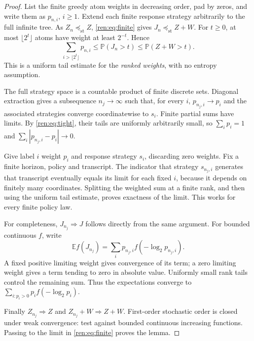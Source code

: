 \documentclass[11pt,a4paper]{article}
\theoremstyle{definition}\newtheorem{definition}[theorem]{Definition}
\theoremstyle{remark}\newtheorem{remark}[theorem]{Remark}
\newcommand{\E}{\mathbb E}
\newcommand{\Pp}{\mathbb P}
\newcommand{\st}{\preceq_{\mathrm{st}}}
\numberwithin{equation}{section}
\begin{document}
\begin{proof}
List the finite greedy atom weights in decreasing order, pad by zeros, and
write them as $p_{n,i}$, $i\ge1$. Extend each finite response strategy
arbitrarily to the full infinite tree. As $Z_n\st Z$, \eqref{ren:eq:finite} gives
$J_n\st Z+W$. For $t\ge0$, at most $\lfloor2^t\rfloor$ atoms have weight
at least $2^{-t}$. Hence
\begin{equation}\label{ren:eq:tight}
 \sum_{i>\lfloor2^t\rfloor}p_{n,i}
 \le \Pp(J_n>t)\le\Pp(Z+W>t).
\end{equation}
This is a uniform tail estimate for the \emph{ranked weights}, with no
entropy assumption.

The full strategy space is a countable product of finite discrete sets.
Diagonal extraction gives a subsequence $n_j\to\infty$ such that, for every
$i$, $p_{n_j,i}\to p_i$ and the associated strategies converge coordinatewise
to $s_i$. Finite partial sums have limits. By \eqref{ren:eq:tight}, their tails
are uniformly arbitrarily small, so $\sum_i p_i=1$ and
$\sum_i|p_{n_j,i}-p_i|\to0$.

Give label $i$ weight $p_i$ and response strategy $s_i$, discarding zero
weights. Fix a finite horizon, policy and transcript. The indicator that
strategy $s_{n_j,i}$ generates that transcript eventually equals its limit
for each fixed $i$, because it depends on finitely many coordinates.
Splitting the weighted sum at a finite rank, and then using the uniform
tail estimate, proves exactness of the limit. This works for every finite
policy law.

For completeness, $J_{n_j}\Rightarrow J$ follows directly from the same
argument. For bounded continuous $f$, write
\[
 \E f(J_{n_j})=\sum_i p_{n_j,i}f(-\log_2p_{n_j,i}).
\]
A fixed positive limiting weight gives convergence of its term; a zero
limiting weight gives a term tending to zero in absolute value. Uniformly
small rank tails control the remaining sum. Thus the expectations converge
to $\sum_{i:p_i>0}p_i f(-\log_2p_i)$.

Finally $Z_{n_j}\Rightarrow Z$ and $Z_{n_j}+W\Rightarrow Z+W$.
First-order stochastic order is closed under weak convergence: test against
bounded continuous increasing functions. Passing to the limit in
\eqref{ren:eq:finite} proves the lemma.
\end{proof}
\end{document}
